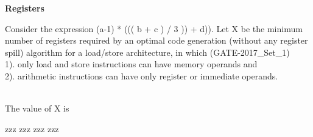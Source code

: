 
\centerline{\textbf{ \LARGE Registers }}

\begin{questyle}
  \question  Consider the expression (a-1) * ((( b + c ) / 3 )) + d)). Let X be the minimum number of
             registers required by an optimal code generation (without any register spill) algorithm
             for a load/store architecture, in which  (GATE-2017\_Set\_1)
             \\ 1). only load and store instructions can have memory operands and
             \\ 2). arithmetic instructions can have only register or immediate operands.

             \\ The value of X is \fillin[2]

  \begin{choices}
    \choice         zzz
    \choice         zzz
    \choice         zzz
    \choice         zzz
\CorrectChoice
  \end{choices}
\end{questyle}

